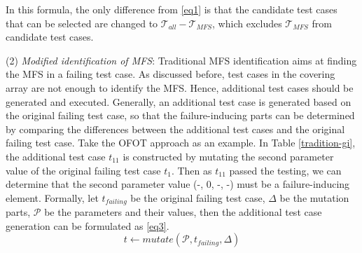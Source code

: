 \documentclass[journal,12pt,onecolumn,draftclsnofoot,]{IEEEtran}
\begin{document}
In this formula, the only difference from \ref{eq1} is that the candidate test cases that can be selected are changed to $\mathcal{T}_{all} - \mathcal{T}_{MFS}$, which excludes $\mathcal{T}_{MFS}$ from candidate test cases.




%
%






(2) \emph{Modified identification of MFS}: Traditional MFS identification aims at finding the MFS in a failing test case. As discussed before, test cases in the covering array are not enough to identify the MFS. Hence, additional test cases should be generated and executed. Generally, an additional test case is generated based on the original failing test case, so that the failure-inducing parts can be determined by comparing the differences between the additional test cases and the original failing test case. Take the OFOT approach as an example. In Table \ref{tradition-gi}, the additional test case $t_{11}$ is constructed by mutating the second parameter value of the original failing test case $t_{1}$. Then as $t_{11}$ passed the testing, we can determine that the second parameter value (-, 0, -, -) must be a failure-inducing element. Formally, let $t_{failing}$ be the original failing test case, $\Delta$ be the mutation parts, $\mathcal{P}$ be the parameters and their values, then the additional test case generation can be formulated as \ref{eq3}.
\begin{displaymath}t \leftarrow  mutate (\mathcal{P}, t_{failing}, \Delta )  \tag{EQ3} \label{eq3} \end{displaymath}
\end{document}
